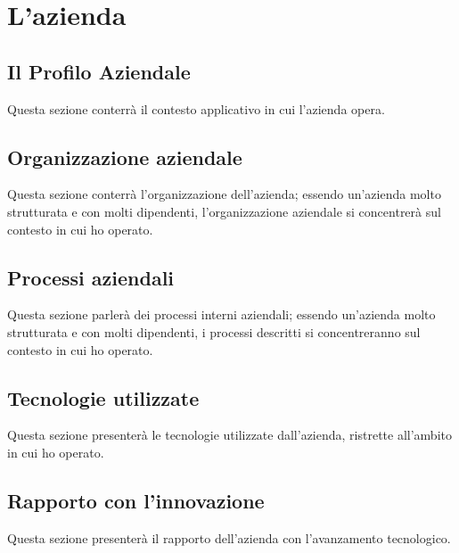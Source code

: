 

\chapter{L'azienda}
\label{cap:azienda}

\section{Il Profilo Aziendale}
\label{sec:il_profilo_aziendale}
Questa sezione conterrà il contesto applicativo in cui l'azienda opera.

\section{Organizzazione aziendale}
\label{sec:organizzazione_aziendale}
Questa sezione conterrà l'organizzazione dell'azienda; essendo un'azienda molto strutturata e con molti dipendenti, l'organizzazione aziendale si concentrerà sul contesto in cui ho operato.

\section{Processi aziendali}
\label{sec:processi_aziendali}
Questa sezione parlerà dei processi interni aziendali; essendo un'azienda molto strutturata e con molti dipendenti, i processi descritti si concentreranno sul contesto in cui ho operato.

\section{Tecnologie utilizzate}
\label{sec:tecnologie_utilizzate}
Questa sezione presenterà le tecnologie utilizzate dall'azienda, ristrette all'ambito in cui ho operato.

\section{Rapporto con l'innovazione}
\label{sec:rapporto_con_innovazione}
Questa sezione presenterà il rapporto dell'azienda con l'avanzamento tecnologico.
